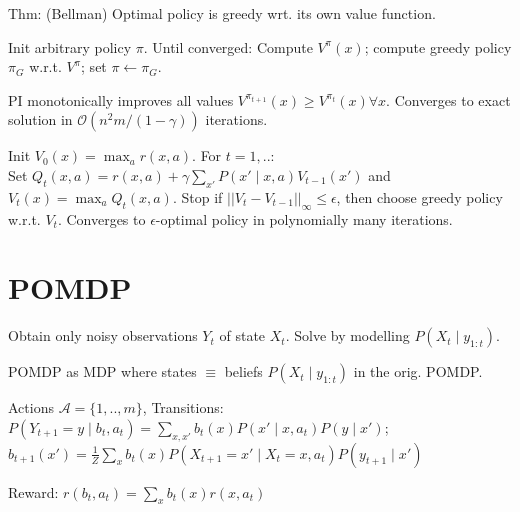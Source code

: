 Thm: (Bellman) Optimal policy is greedy wrt. its own value function.



Init arbitrary policy $\pi$.
Until converged: {Compute $V^{\pi}(x)$; compute}
{greedy policy $\pi_G$ w.r.t. $V^{\pi}$; set $\pi \leftarrow \pi_G$}.

PI monotonically improves all values $V^{\pi_{t+1}}(x) \geq V^{\pi_{t}}(x) \forall x$. 
Converges to exact solution in $\mathcal{O}(n^2 m / (1-\gamma))$ iterations.


Init $V_0(x) = \max_a r(x,a)$.
For $t = 1,..$: \\
Set \hbox{$Q_t(x,a)=r(x,a)+\gamma\sum_{x'}P(x'\mid x,a)V_{t-1}(x')$} and
{$V_t(x) = \max_a Q_t(x,a)$}.
Stop if $||V_t - V_{t-1}||_\infty \leq \epsilon$, then choose
greedy policy w.r.t. $V_t$. Converges to $\epsilon$-optimal 
policy in polynomially many iterations.

\section{POMDP}
Obtain only noisy observations $Y_t$ of state $X_t$.
Solve by modelling $P(X_t\mid y_{1:t})$.

 POMDP as MDP where states $\equiv$ beliefs
$P(X_t \mid  y_{1:t})$ in the orig. POMDP. 


{Actions $\mathcal{A} = \{1,..,m\}$},
 Transitions: $P(Y_{t+1} = y \mid  b_t, a_t) = \sum_{x,x'} b_t(x) P(x' \mid  x, a_t) P(y \mid  x')$;
$b_{t+1}(x') = \frac{1}{Z} \sum_x b_t(x) P(X_{t+1} = x' \mid  X_t = x, a_t) P(y_{t+1} \mid  x')$

Reward: $r(b_t, a_t) = \sum_x b_t(x) r(x, a_t)$

